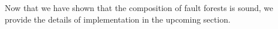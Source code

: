 Now that we have shown that the composition of fault forests is sound, we provide the details of implementation in the upcoming section. 

